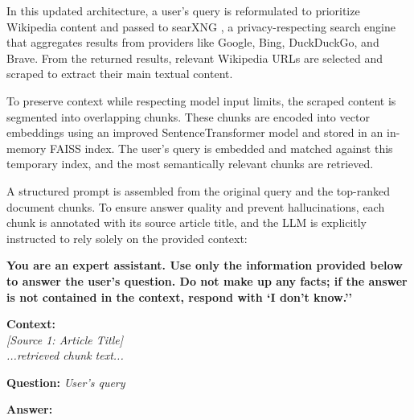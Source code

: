 \documentclass[fleqn,moreauthors,10pt]{ds_report}
\begin{document}
In this updated architecture, a user's query is reformulated to prioritize Wikipedia content and passed to searXNG \cite{searxng2025}, a privacy-respecting search engine that aggregates results from providers like Google, Bing, DuckDuckGo, and Brave. From the returned results, relevant Wikipedia URLs are selected and scraped to extract their main textual content.

To preserve context while respecting model input limits, the scraped content is segmented into overlapping chunks. These chunks are encoded into vector embeddings using an improved SentenceTransformer model and stored in an in-memory FAISS index. The user’s query is embedded and matched against this temporary index, and the most semantically relevant chunks are retrieved.

A structured prompt is assembled from the original query and the top-ranked document chunks. To ensure answer quality and prevent hallucinations, each chunk is annotated with its source article title, and the LLM is explicitly instructed to rely solely on the provided context:

\begin{tcolorbox}[colback=gray!10!white, colframe=gray!80!black, boxrule=0.8pt, arc=3pt, left=3pt, right=3pt, top=3pt, bottom=3pt]
\textbf{You are an expert assistant. Use only the information provided below to answer the user’s question. Do not make up any facts; if the answer is not contained in the context, respond with `I don’t know.''}

\vspace{6pt}
\textbf{Context:} \\
\textit{[Source 1: Article Title]} \\
\textit{...retrieved chunk text...}

\vspace{6pt}
\textbf{Question:} \textit{User's query}

\vspace{6pt}
\textbf{Answer:}
\end{tcolorbox}
\end{document}
